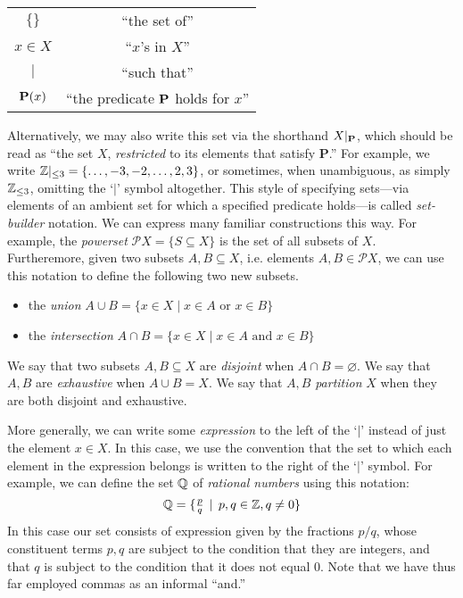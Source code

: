 \begin{table}[h]
    \centering
    \begin{tabular}{c||c}
        $\{\}$ & ``the set of'' \\
        $x\in X$ & ``$x$'s in $X$'' \\
        $\mid$ & ``such that'' \\
        $\mathbf P(x)$ & ``the predicate $\mathbf P$ holds for $x$''
    \end{tabular}
\end{table}
Alternatively, we may also write this set via the shorthand $X|_{\mathbf P}$, which should be read as ``the set $X$, \emph{restricted} to its elements that satisfy $\mathbf{P}$.'' For example, we write $\mathbb Z|_{\leq 3}=\{\dots,-3,-2,\dots,2,3\}$, or sometimes, when unambiguous, as simply $\mathbb Z_{\leq 3}$, omitting the `$|$' symbol altogether. This style of specifying sets---via elements of an ambient set for which a specified predicate holds---is called \emph{set-builder} notation. We can express many familiar constructions this way. For example, the \emph{powerset} $\mathcal{P}X=\{S\subseteq X\}$ is the set of all subsets of $X$. Furtheremore, given two subsets $A,B\subseteq X$, i.e. elements $A,B\in\mathcal{P}X$, we can use this notation to define the following two new subsets.
\begin{itemize}
    \item the \emph{union} $A\cup B = \{x\in X\mid x\in A\text{ or }x\in B\}$
    \item the \emph{intersection} $A\cap B = \{x\in X\mid x\in A\text{ and }x\in B\}$
\end{itemize}
We say that two subsets $A,B\subseteq X$ are \emph{disjoint} when $A\cap B=\varnothing$. We say that $A,B$ are \emph{exhaustive} when $A\cup B=X$. We say that $A,B$ \emph{partition} $X$ when they are both disjoint and exhaustive.

More generally, we can write some \emph{expression} to the left of the `$|$'  instead of just the element $x\in X$. In this case, we use the convention that the set to which each element in the expression belongs is written to the right of the `$\mid$' symbol. For example, we can define the set $\mathbb Q$ of \emph{rational numbers} using this notation:
\[\mathbb Q = \{\tfrac{p}{q}\,\mid\,p,q\in\mathbb Z,q\neq 0\}\]
In this case our set consists of expression given by the fractions $p/q$, whose constituent terms $p,q$ are subject to the condition that they are integers, and that $q$ is subject to the condition that it does not equal $0$. Note that we have thus far employed commas as an informal ``and.''

